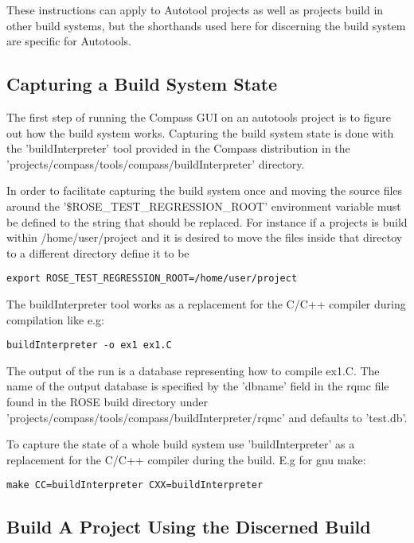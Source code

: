 These instructions can apply to Autotool projects as well as projects build in other build 
systems, but the shorthands used here for discerning the build system are specific for Autotools.


\subsection{Capturing a Build System State}


The first step of running the Compass GUI on an autotools project is to figure out how the build system
works. Capturing the build system state is done with the 'buildInterpreter' tool provided in the Compass
distribution in the 'projects/compass/tools/compass/buildInterpreter' directory. 

In order to facilitate capturing the build system once and moving the source files around the '\$ROSE\_TEST\_REGRESSION\_ROOT' environment variable must be defined to the string that should be replaced. For instance if a
projects is build within /home/user/project and it is desired to move the files inside that directoy to a
different directory define it to be
\begin{verbatim}
export ROSE_TEST_REGRESSION_ROOT=/home/user/project
\end{verbatim}


The buildInterpreter tool works as a replacement for the C/C++ compiler during compilation like e.g:
\begin{verbatim}
buildInterpreter -o ex1 ex1.C
\end{verbatim}
The output of the run is a database representing how to compile ex1.C. The name of the output database is specified
by the 'dbname' field in the rqmc file found in the ROSE build directory under 'projects/compass/tools/compass/buildInterpreter/rqmc' and defaults to 'test.db'.

To capture the state of a whole build system use 'buildInterpreter' as a replacement for the C/C++ compiler during
the build. E.g for gnu make:
\begin{verbatim}
make CC=buildInterpreter CXX=buildInterpreter
\end{verbatim}

\subsection{Build A Project Using the Discerned Build }

